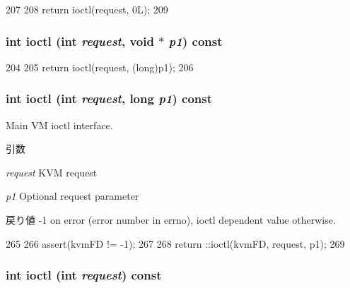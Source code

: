 \begin{DoxyCode}
207                                  {
208         return ioctl(request, 0L);
209     }
\end{DoxyCode}
\hypertarget{group__KvmIoctl_ga89db87cb31fe2ba732de8fa68c8bd1f1}{
\subsubsection[{ioctl}]{\setlength{\rightskip}{0pt plus 5cm}int ioctl (int {\em request}, \/  void $\ast$ {\em p1}) const}}
\label{group__KvmIoctl_ga89db87cb31fe2ba732de8fa68c8bd1f1}



\begin{DoxyCode}
204                                            {
205         return ioctl(request, (long)p1);
206     }
\end{DoxyCode}
\hypertarget{group__KvmIoctl_ga106fe09b5e87d6c14884f8ffff7b338a}{
\subsubsection[{ioctl}]{\setlength{\rightskip}{0pt plus 5cm}int ioctl (int {\em request}, \/  long {\em p1}) const}}
\label{group__KvmIoctl_ga106fe09b5e87d6c14884f8ffff7b338a}
Main VM ioctl interface.


\begin{DoxyParams}{引数}
\item[{\em request}]KVM request \item[{\em p1}]Optional request parameter\end{DoxyParams}
\begin{DoxyReturn}{戻り値}
-\/1 on error (error number in errno), ioctl dependent value otherwise. 
\end{DoxyReturn}



\begin{DoxyCode}
265 {
266     assert(kvmFD != -1);
267 
268     return ::ioctl(kvmFD, request, p1);
269 }
\end{DoxyCode}
\hypertarget{group__KvmIoctl_ga32cd3b0742689c29c9ab9e3e03feb5f2}{
\subsubsection[{ioctl}]{\setlength{\rightskip}{0pt plus 5cm}int ioctl (int {\em request}) const}}
\label{group__KvmIoctl_ga32cd3b0742689c29c9ab9e3e03feb5f2}



